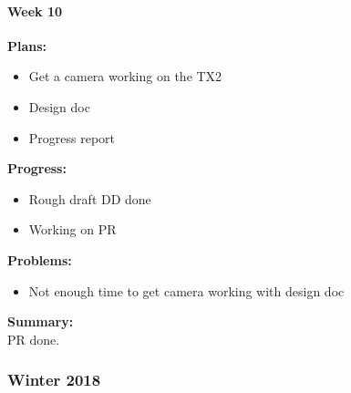 \paragraph{Week 10}
\begin{adjustwidth}{2.5em}{0pt} 
    \vspace{-0.5cm}\textbf{Plans:}
    \vspace{-0.5cm}
    \begin{itemize}
        \item Get a camera working on the TX2
        \item Design doc
        \item Progress report
    \end{itemize} 
    \vspace{-0.3cm}\textbf{Progress:}
    \vspace{-0.5cm}
    \begin{itemize}
        \item Rough draft DD done
        \item Working on PR
    \end{itemize} 
    \vspace{-0.3cm}\textbf{Problems:}
    \vspace{-0.5cm}
    \begin{itemize}
        \item Not enough time to get camera working with design doc
    \end{itemize} 
    \vspace{-0.3cm}\noindent\textbf{Summary:}\\
    \noindent 
    PR done. 
\end{adjustwidth} 

\subsubsection{Winter 2018}

